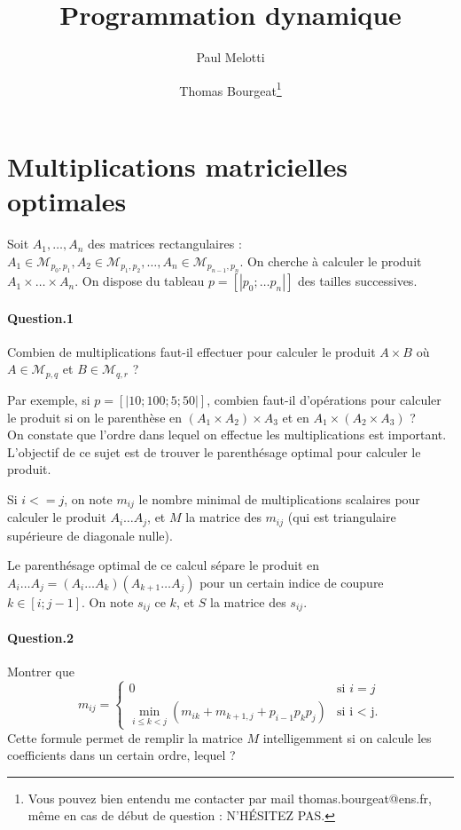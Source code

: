 \documentclass[10pt,a4paper]{article}
\begin{document}
\title{Programmation dynamique}
\author{Paul Melotti \and Thomas Bourgeat\footnote{Vous pouvez bien entendu me contacter par mail thomas.bourgeat@ens.fr, même en cas de début de question : N'HÉSITEZ PAS.}}
\maketitle{}

\section{Multiplications matricielles optimales}
Soit $A_1, \dots, A_n$ des matrices rectangulaires : 
$A_1\in \mathcal{M}_{p_0,p_1}, A_2\in \mathcal{M}_{p_1,p_2}, \dots, A_n\in \mathcal{M}_{p_{n-1},p_n}$.
On cherche à calculer le produit $A_1 \times \dots \times A_n$.
On dispose du tableau $p = [|p_0 ; \dots p_n |]$ des tailles successives.

\paragraph{Question.1}

Combien de multiplications faut-il effectuer pour calculer le produit $A\times B$
où $A\in \mathcal{M}_{p,q}$ et $B\in \mathcal{M}_{q,r}$ ?

Par exemple, si $p=[|10;100;5;50|]$, combien faut-il d'opérations pour calculer
le produit si on le parenthèse en $(A_1 \times A_2) \times A_3$ et en 
$A_1 \times (A_2 \times A_3)$ ?
\\

On constate que l'ordre dans lequel on effectue les multiplications est 
important. L'objectif de ce sujet est de trouver le parenthésage optimal pour 
calculer le produit.

Si $i <= j$, on note $m_{ij}$ le nombre minimal de multiplications scalaires 
pour calculer le produit $A_i \dots A_j$, et $M$ la matrice des
$m_{ij}$ (qui est triangulaire supérieure de diagonale nulle).

Le parenthésage optimal de ce calcul sépare le produit en 
$A_i \dots A_j = (A_i \dots A_k) (A_{k+1} \dots A_j)$ pour un certain indice de
coupure $k\in [i;j-1]$. On note $s_{ij}$ ce $k$, et $S$ la matrice des $s_{ij}$.

\paragraph{Question.2} Montrer que 
\[m_{ij} = \left\{
	\begin{array}{ll}
		0  & \mbox{si } i=j \\
		\min_{i\leq k < j} (m_{ik} + m_{k+1,j} + p_{i-1} p_k p_j) & \mbox{si i < j}.
	\end{array}
\right.\]
Cette formule permet de remplir la matrice $M$ intelligemment si on calcule les
coefficients dans un certain ordre, lequel ?
\end{document}
